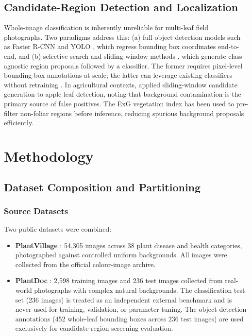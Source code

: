 \documentclass[pdflatex,sn-mathphys-num]{sn-jnl}
\theoremstyle{thmstyleone}%
\theoremstyle{thmstyletwo}%
\theoremstyle{thmstylethree}%
\begin{document}
\subsection{Candidate-Region Detection and Localization}

Whole-image classification is inherently unreliable for multi-leaf field photographs.
Two paradigms address this: (a) full object detection models such as Faster R-CNN
\citep{ren2015fasterrcnn} and YOLO \citep{redmon2016yolo}, which regress bounding box
coordinates end-to-end, and (b) selective search and sliding-window methods
\citep{barbedo2018factors}, which generate class-agnostic region proposals followed by
a classifier. The former requires pixel-level bounding-box annotations at scale; the
latter can leverage existing classifiers without retraining \citep{he2021multiscale}.
In agricultural contexts, \citet{jiang2019realtime} applied sliding-window candidate
generation to apple leaf detection, noting that background contamination is the
primary source of false positives. The ExG vegetation index \citep{woebbecke1995color}
has been used to pre-filter non-foliar regions before inference, reducing spurious
background proposals efficiently.


\section{Methodology}
\label{sec:methodology}

\subsection{Dataset Composition and Partitioning}
\label{sec:dataset}

\subsubsection{Source Datasets}

Two public datasets were combined:
\begin{itemize}
  \item \textbf{PlantVillage} \citep{hughes2015plantvillage}: 54{,}305 images across
        38 plant disease and health categories, photographed against controlled uniform
        backgrounds. All images were collected from the official colour-image archive.
  \item \textbf{PlantDoc} \citep{singh2020plant}: 2{,}598 training images and 236 test
        images collected from real-world photographs with complex natural backgrounds.
        The classification test set (236 images) is treated as an independent external
        benchmark and is never used for training, validation, or parameter tuning.
        The object-detection annotations (452 whole-leaf bounding boxes across 236 test
        images) are used exclusively for candidate-region screening evaluation.
\end{itemize}
\end{document}
